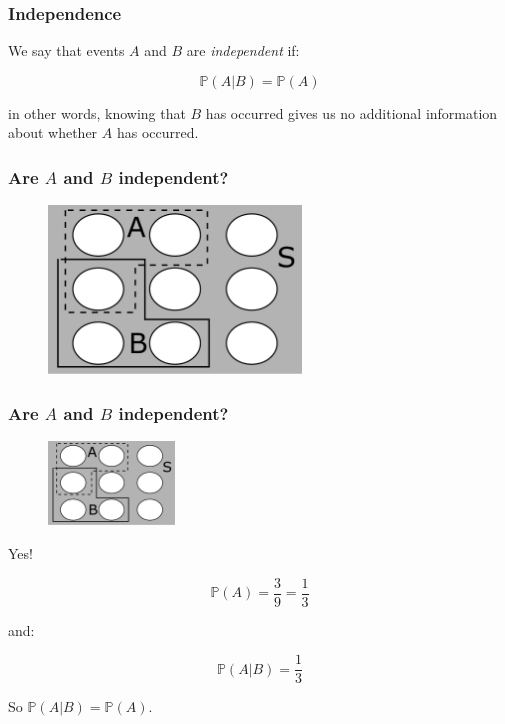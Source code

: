 \documentclass{beamer}
\begin{document}
	\begin{frame}
		\frametitle{Independence}
	
	We say that events $A$ and $B$ are \textit{independent} if:
	
	\begin{equation}
		\mathbb{P}(A|B) =  \mathbb{P}(A)
	\end{equation}

	in other words, knowing that $B$ has occurred gives us no additional information about whether $A$ has occurred.
		
	\end{frame}

	\begin{frame}
		\frametitle{Are $A$ and $B$ independent?}
		
			\begin{figure}[ht]
			\centerline{\includegraphics[width=0.6\textwidth]{./figures/pebble_world_prob_independent.pdf}}
		\end{figure}
		
	\end{frame}

	\begin{frame}
		\frametitle{Are $A$ and $B$ independent?}
		
		\begin{figure}[ht]
			\centerline{\includegraphics[width=0.3\textwidth]{./figures/pebble_world_prob_independent.pdf}}
		\end{figure}
	
	Yes!
	
	\begin{equation}
		\mathbb{P}(A) =  \frac{3}{9} = \frac{1}{3}
	\end{equation}

	and:
	
	\begin{equation}
		\mathbb{P}(A|B) =  \frac{1}{3}
	\end{equation}

	So $\mathbb{P}(A|B) = \mathbb{P}(A)$.
		
	\end{frame}
	
\end{document}
